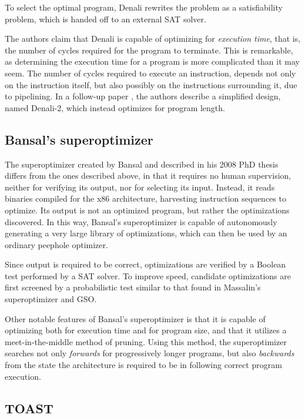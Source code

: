 \documentclass[a4paper,11pt]{kth-mag}
\begin{document}
To select the optimal program, Denali rewrites the problem as a satisfiability problem, which is handed off to an external SAT solver.

The authors claim that Denali is capable of optimizing for \emph{execution time}, that is, the number of cycles required for the program to terminate.
This is remarkable, as determining the execution time for a program is more complicated than it may seem.
The number of cycles required to execute an instruction, depends not only on the instruction itself, but also possibly on the instructions surrounding it, due to pipelining.
In a follow-up paper \cite{joshi06}, the authors describe a simplified design, named Denali-2, which instead optimizes for program length.


\subsection{Bansal's superoptimizer}

The superoptimizer created by Bansal and described in his 2008 PhD thesis \cite{bansal_thesis} differs from the ones described above, in that it requires no human supervision, neither for verifying its output, nor for selecting its input.
Instead, it reads binaries compiled for the x86 architecture, harvesting instruction sequences to optimize.
Its output is not an optimized program, but rather the optimizations discovered.
In this way, Bansal's superoptimizer is capable of autonomously generating a very large library of optimizations, which can then be used by an ordinary peephole optimizer.

Since output is required to be correct, optimizations are verified by a Boolean test performed by a SAT solver.
To improve speed, candidate optimizations are first screened by a probabilistic test similar to that found in Massalin's superoptimizer and GSO.


Other notable features of Bansal's superoptimizer is that it is capable of optimizing both for execution time and for program size, and that it utilizes a meet-in-the-middle method of pruning.
Using this method, the superoptimizer searches not only \emph{forwards} for progressively longer programs, but also \emph{backwards} from the state the architecture is required to be in following correct program execution.

\subsection{TOAST}
\end{document}
